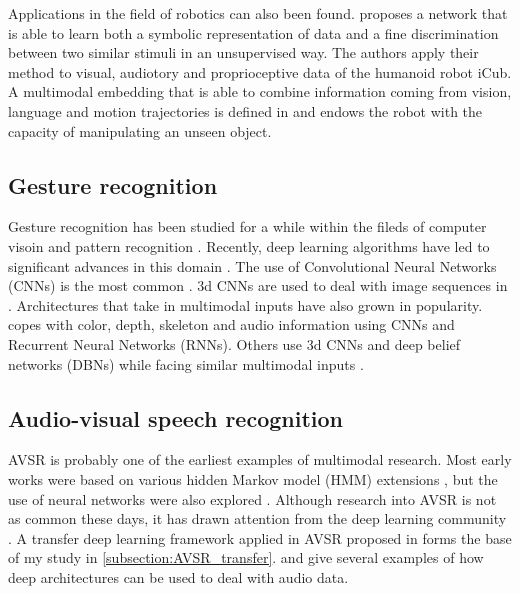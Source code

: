 Applications in the field of robotics can also been found.
\cite{A. Droniou 2014} proposes a network that is able to learn both
a symbolic representation of data and a fine discrimination between
two similar stimuli in an unsupervised way. The authors apply their method
to visual, audiotory and proprioceptive data of the humanoid robot iCub.
A multimodal embedding that is able to combine information coming from
vision, language and motion trajectories is defined in \cite{J. Sung 2017}
and endows the robot with the capacity of manipulating an unseen object.

\subsection{Gesture recognition}

Gesture recognition has been studied for a while within the fileds of
computer visoin and pattern recognition
\cite{T. Starner 1998, S. Mitra 2007}.
Recently, deep learning algorithms have led to
significant advances in this domain \cite{M. Asadi-Aghbolaghi 2017}.
The use of Convolutional Neural Networks (CNNs) is the most common
\cite{J. Nagi 2011}. 3d CNNs are used to deal with image sequences in
\cite{P. Molchanov 2015}. Architectures that take in multimodal inputs
have also grown in popularity. \cite{N. Neverova 2013} copes with color,
depth, skeleton and audio information using CNNs and Recurrent
Neural Networks (RNNs). Others use 3d CNNs and deep belief networks
(DBNs) while facing similar multimodal inputs
\cite{N. Neverova 2014, L. Pigou 2014, D. Wu 2016}.

\subsection{Audio-visual speech recognition}

AVSR is probably one of the earliest examples of multimodal research.
Most early works were based on various hidden Markov model (HMM) extensions
\cite{G. Potamianos 2004}, but the use of neural networks were also
explored \cite{C. Bregler 1994, B. P. Yuhas 1989}. Although research
into AVSR is not as common these days, it has drawn attention from the
deep learning community
\cite{J. Ngiam 2011, K. Noda 2014, A. K. Katsaggelos 2015}.
A transfer deep learning framework applied in AVSR proposed in
\cite{S. Moon 2015} forms the base of my study in
\ref{subsection:AVSR_transfer}. \cite{L. Deng 2013} and
\cite{G. Hinton 2012} give several examples of how deep architectures can
be used to deal with audio data.

